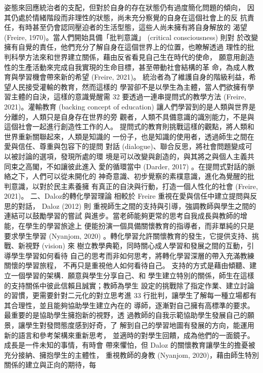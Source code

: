 姿態來回應統治者的支配，但對於自身的存在狀態仍有過度簡化問題的傾向，
因其仍處於情緒階段而非理性的狀態，尚未充分察覺的自身在這個社會上的反
抗責任，有時甚至仍會認同壓迫者的生活型態，這些人尚未擁有將自身解放的
渴望 (Freire, 1970)。當人們開始具備「批判意識」 (critical consciousness) 則對
於改變擁有自覺的責任，他們充分了解自身在這個世界上的位置，也瞭解透過
理性的批判科學方法來和世界建立關係，藉由反省看見自己生在時代的使命，
願意用創造性的生產活動來完成自我實現的生命目標，甚至帶動社會結構的革
命，為成人教育與學習機會帶來新的希望 (Freire, 2021)。 
統治者為了維護自身的階級利益，希望人民接受灌輸的教育，然而這樣的
學習卻不是以學生為主體，當人們欲擁有學習主體的自決，這樣的意識覺醒需
32 
要透過一連串提問式的教學方法 (Freire, 2021)。灌輸教育 (backing concept of 
education) 讓人們學習到的是人類與世界是分離的，人類只是自身存在世界的旁
觀者，人類不具備意識的識別能力，不是與這個社會一起進行創造性工作的人。
提問式的教育則挑戰這樣的觀點，將人類和世界重新關聯起來，人類是知識的
一份子，也是知識的使用者，透過師生之間在愛與信任、尊重與包容下的提問
對話 (dialogue)、聯合反思，將社會問題變成可以被討論的選項，發現所處的環
境是可以改變與創造的，與其將之與個人主義共同束之高閣，不如讓彼此進入
愛的循環當中 (Darder, 2017) 。在提問式對話的脈絡之下，人們可以從未開化的
神奇意識、初步覺察的素樸意識，進化為覺醒的批判意識，以對於民主素養擁
有真正的自決與行動，打造一個人性化的社會 (Freire, 2021)。 
二、Daloz的轉化學習理論 
相較於 Freire 重視在愛與信任中建立提問與反思的對話， Daloz (2012) 則
重視師生之間的支持與引導，強調教師與學生之間的連結可以鼓勵學習的嘗試
與進步。當老師能夠更常的思考自我成長與教師的增能，在學生的學習旅途上
便能扮演一個具備關懷教育的指導者，而非單純的只是要求學生學習 (Nyanjom, 
2020) 。轉化學習允許關懷教育的發生，它提供支持、挑戰、新視野 (vision) 來
樹立教學典範，同時關心成人學習和發展之間的互動，引導學生學習如何看待
自己的思考而非如何思考，將轉化學習深層的帶入充滿教練關懷的學習旅程，
不再只是重視他人如何看待自己。 
支持的方式是藉由傾聽、建立一個學習的架構．願意與學生分享自己、和
學生建立特別的關係，師生在這樣的支持關係中彼此信賴且誠實；教師為學生
設定的挑戰除了指定作業、建立討論的習慣，更需要針對二元化的對立思考進
33 
行批判，讓學生了解每一種立場都有其合理性，並且能夠協助學生建立內在的
導師，逐漸對自己擁有高標準的要求。最重要的是協助學生擁抱新的視野，透
過教師的自我示範協助學生發展自己的願景，讓學生對發問態度感到好奇，了
解到自己的學習地圖有發展的方向，能運用新的語言和參考架構來重新思考，
並適時的對學生回饋，成為他們的一面鏡子。成長是一件未知的事情，有時會
帶來懼怕，但 Daloz 的關懷教育讓學生的擔憂被充分接納、擁抱學生的主體性，
重視教師的身教 (Nyanjom, 2020)，藉由師生特別關係的建立與正向的期待，每
